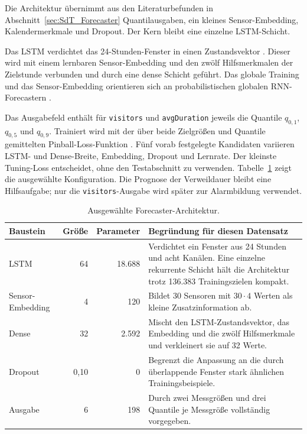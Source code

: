 Die Architektur übernimmt aus den Literaturbefunden in
Abschnitt~\ref{sec:SdT_Forecaster} Quantilausgaben, ein kleines
Sensor-Embedding, Kalendermerkmale und Dropout. Der Kern bleibt eine einzelne
LSTM-Schicht.

Das LSTM verdichtet das 24-Stunden-Fenster in einen Zustandsvektor
\cite{hochreiter1997long}. Dieser wird mit einem lernbaren Sensor-Embedding und
den zwölf Hilfsmerkmalen der Zielstunde verbunden und durch eine dense Schicht
geführt. Das globale Training und das Sensor-Embedding orientieren sich an
probabilistischen globalen RNN-Forecastern \cite{salinas2020deepar}.

Das Ausgabefeld enthält für \texttt{visitors} und \texttt{avgDuration} jeweils
die Quantile $q_{0{,}1}$, $q_{0{,}5}$ und $q_{0{,}9}$. Trainiert wird mit der
über beide Zielgrößen und Quantile gemittelten Pinball-Loss-Funktion
\cite{koenker1978regression}. Fünf vorab festgelegte Kandidaten
variieren LSTM- und Dense-Breite, Embedding, Dropout und Lernrate. Der kleinste
Tuning-Loss entscheidet, ohne den Testabschnitt zu verwenden.
Tabelle~\ref{tab:forecaster_architektur} zeigt die ausgewählte Konfiguration.
Die Prognose der Verweildauer bleibt eine Hilfsaufgabe; nur die
\texttt{visitors}-Ausgabe wird später zur Alarmbildung verwendet.

\begin{table}[htb]
  \centering
  \small
  \caption{Ausgewählte Forecaster-Architektur.}
  \label{tab:forecaster_architektur}
  \begin{tabularx}{\textwidth}{lrrX}
    \hline
    Baustein & Größe & Parameter & Begründung für diesen Datensatz \\
    \hline
    LSTM & 64 & 18.688 & Verdichtet ein Fenster aus 24 Stunden und acht
      Kanälen. Eine einzelne rekurrente Schicht hält die Architektur trotz
      136.383 Trainingszielen kompakt. \\
    Sensor-Embedding & 4 & 120 & Bildet 30 Sensoren mit $30\cdot4$ Werten als
      kleine Zusatzinformation ab. \\
    Dense & 32 & 2.592 & Mischt den LSTM-Zustandsvektor, das Embedding und die
      zwölf Hilfsmerkmale und verkleinert sie auf 32 Werte. \\
    Dropout & 0{,}10 & 0 & Begrenzt die Anpassung an die durch überlappende
      Fenster stark ähnlichen Trainingsbeispiele. \\
    Ausgabe & 6 & 198 & Durch zwei Messgrößen und drei Quantile je
      Messgröße vollständig vorgegeben. \\
    \hline
  \end{tabularx}
\end{table}

